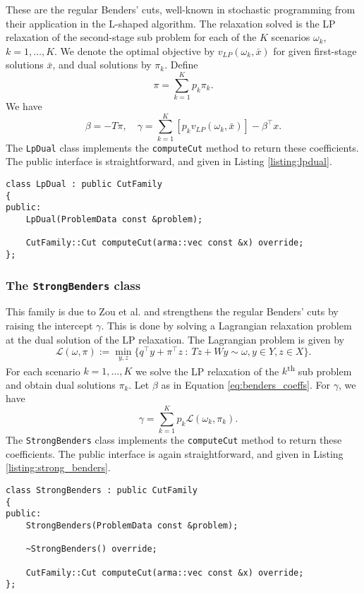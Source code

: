 \documentclass[12pt, english]{article}
\begin{document}
These are the regular Benders' cuts, well-known in stochastic programming from their application in the L-shaped algorithm. The relaxation solved is the LP relaxation of the second-stage sub problem for each of the $K$ scenarios $\omega_k$, $k = 1,\ldots,K$. We denote the optimal objective by $v_{LP}(\omega_k, \bar x)$ for given first-stage solutions $\bar x$, and dual solutions by $\pi_k$. Define
\[ \pi = \sum_{k = 1}^K p_k \pi_k. \]
We have
\begin{equation}
\beta = -T\pi, \quad
\gamma = \sum_{k = 1}^K \left[ p_k v_{LP}(\omega_k, \bar x) \right] - \beta^\top x.
\label{eq:benders_coeffs}
\end{equation}
The \texttt{LpDual} class implements the \texttt{computeCut} method to return these coefficients. The public interface is straightforward, and given in Listing \ref{listing:lpdual}.
\begin{lstlisting}[caption={Public interface of the \texttt{LpDual} class.}, 
                   label={listing:lpdual}]
class LpDual : public CutFamily
{
public:
	LpDual(ProblemData const &problem);
	
	CutFamily::Cut computeCut(arma::vec const &x) override;
};
\end{lstlisting}

\subsubsection{The \texttt{StrongBenders} class}
\label{subsubsec:strong_benders}

This family is due to Zou et al. \cite{zou2019} and strengthens the regular Benders' cuts by raising the intercept $\gamma$. This is done by solving a Lagrangian relaxation problem at the dual solution of the LP relaxation. The Lagrangian problem is given by
\[ \mathcal{L}(\omega, \pi) := \min_{y, z} \{ q^\top y + \pi^\top z~:~Tz + Wy \sim \omega, y \in Y, z \in X \}. \]
For each scenario $k = 1,\ldots,K$ we solve the LP relaxation of the $k$\textsuperscript{th} sub problem and obtain dual solutions $\pi_k$. Let $\beta$ as in Equation \ref{eq:benders_coeffs}. For $\gamma$, we have
\begin{equation}
\quad \gamma = \sum_{k = 1}^K p_k \mathcal{L}(\omega_k, \pi_k).
\label{eq:strong_benders_coeffs}
\end{equation}
The \texttt{StrongBenders} class implements the \texttt{computeCut} method to return these coefficients. The public interface is again straightforward, and given in Listing \ref{listing:strong_benders}.
\begin{lstlisting}[caption={Public interface of the \texttt{StrongBenders} class.}, 
                   label={listing:strong_benders}]
class StrongBenders : public CutFamily
{
public:
	StrongBenders(ProblemData const &problem);
	
	~StrongBenders() override;
	
	CutFamily::Cut computeCut(arma::vec const &x) override;
};
\end{lstlisting}
\end{document}
